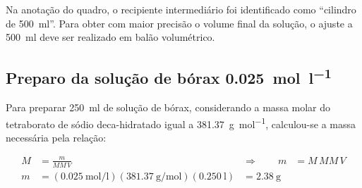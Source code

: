 \documentclass[a4paper,12pt]{article}
\begin{document}
\begin{tcolorbox}[
  title=Observação técnica,
  colback=quadrocinza,
  colframe=black!65,
  boxrule=0.6pt,
  arc=1mm
]
Na anotação do quadro, o recipiente intermediário foi identificado como ``cilindro de \qty{500}{\milli\litre}''. Para obter com maior precisão o volume final da solução, o ajuste a \qty{500}{\milli\litre} deve ser realizado em balão volumétrico.
\end{tcolorbox}

\subsection{Preparo da solução de bórax \qty{0.025}{\mole\per\litre}}

Para preparar \qty{250}{\milli\litre} de solução de bórax, considerando a massa molar do tetraborato de sódio deca-hidratado igual a \qty{381.37}{\gram\per\mole}, calculou-se a massa necessária pela relação:

\begin{align*}
  M &= \frac{m}{MM\,V}
  &\Longrightarrow\qquad
  m &= M\,MM\,V \\
  m &= \left(\qty{0.025}{\mole\per\litre}\right)
       \left(\qty{381.37}{\gram\per\mole}\right)
       \left(\qty{0.250}{\litre}\right)
  &= \boxed{\qty{2.38}{\gram}}
\end{align*}
\end{document}
